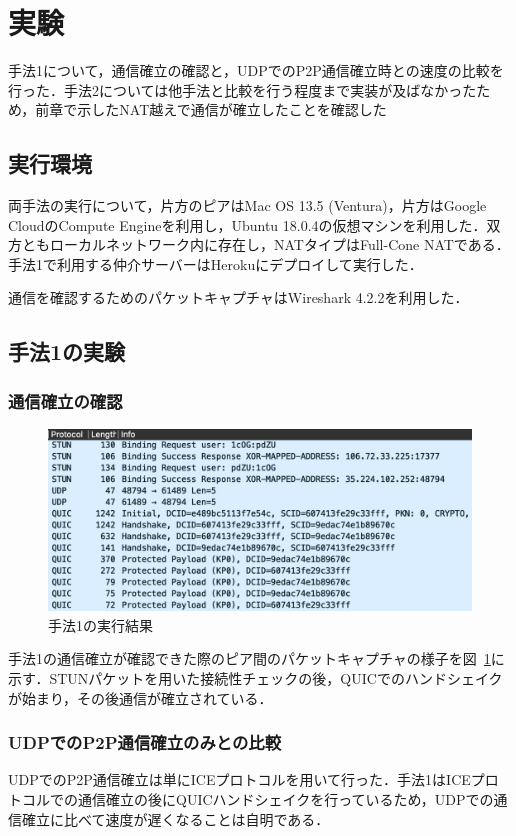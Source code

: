 \section{実験}
手法1について，通信確立の確認と，UDPでのP2P通信確立時との速度の比較を行った．手法2については他手法と比較を行う程度まで実装が及ばなかったため，前章で示したNAT越えで通信が確立したことを確認した

\subsection{実行環境}
両手法の実行について，片方のピアはMac OS 13.5 (Ventura)，片方はGoogle CloudのCompute Engineを利用し，Ubuntu 18.0.4の仮想マシンを利用した．双方ともローカルネットワーク内に存在し，NATタイプはFull-Cone NATである．手法1で利用する仲介サーバーはHerokuにデプロイして実行した．

通信を確認するためのパケットキャプチャはWireshark 4.2.2を利用した．

\subsection{手法1の実験}
\subsubsection{通信確立の確認}
\begin{figure}[h]
  \centering
  \includegraphics[width=\linewidth]{figs/ice-eva.png}
  \caption{手法1の実行結果}
  \label{fig:eva-1}
\end{figure}

手法1の通信確立が確認できた際のピア間のパケットキャプチャの様子を図~\ref{fig:eva-1}に示す．STUNパケットを用いた接続性チェックの後，QUICでのハンドシェイクが始まり，その後通信が確立されている．
\subsubsection{UDPでのP2P通信確立のみとの比較}
UDPでのP2P通信確立は単にICEプロトコルを用いて行った．手法1はICEプロトコルでの通信確立の後にQUICハンドシェイクを行っているため，UDPでの通信確立に比べて速度が遅くなることは自明である．

